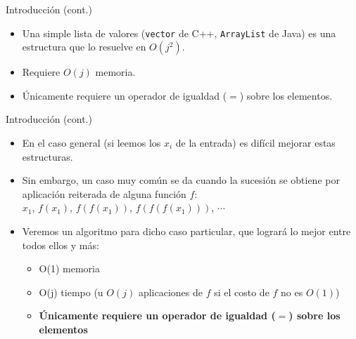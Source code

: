\documentclass{beamer}
\begin{document}
\begin{frame}{Introducción (cont.)}
    \begin{itemize}
         \item Una simple lista de valores (\texttt{vector} de C++, \texttt{ArrayList} de Java) es una estructura que lo resuelve en $O(j^2)$.
         \item Requiere $O(j)$ memoria.
         \item Únicamente requiere un operador de igualdad ($=$) sobre los elementos.
    \end{itemize}
\end{frame}

\begin{frame}{Introducción (cont.)}
    \begin{itemize}
    \item En el caso general (si leemos los $x_i$ de la entrada) es difícil mejorar estas estructuras. 
    \item Sin embargo, un caso muy común se da cuando la sucesión se obtiene por aplicación reiterada de alguna función $f$:\\
             $x_1$, $f(x_1)$, $f(f(x_1))$, $f(f(f(x_1)))$, $\cdots$
    \item Veremos un algoritmo para dicho caso particular, que logrará lo mejor entre todos ellos y más:
        \begin{itemize}
             \item O(1) memoria
             \item O(j) tiempo (u $O(j)$ aplicaciones de $f$ si el costo de $f$ no es $O(1)$)
             \item \textbf{Únicamente requiere un operador de igualdad ($=$) sobre los elementos}
        \end{itemize}
    \end{itemize}
\end{frame}
\end{document}
